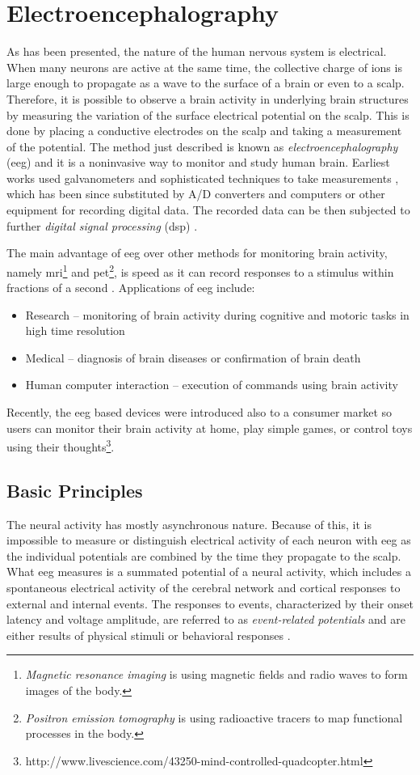 \section{Electroencephalography}
As has been presented, the nature of the human nervous system is electrical. When many neurons are active at the same time, the collective charge of ions is large enough to propagate as a wave to the surface of a brain or even to a scalp. Therefore, it is possible to observe a brain activity in underlying brain structures by measuring the variation of the surface electrical potential on the scalp. This is done by placing a conductive electrodes on the scalp and taking a measurement of the potential. The method just described is known as \emph{electroencephalography} (\gls{eeg}) and it is a noninvasive way to monitor and study human brain. Earliest works used galvanometers and sophisticated techniques to take measurements \cite{eegHistory}, which has been since substituted by A/D converters and computers or other equipment for recording digital data. The recorded data can be then subjected to further \emph{digital signal processing} (\gls{dsp}) \cite{eegClass}.

The main advantage of \gls{eeg} over other methods for monitoring brain activity, namely \gls{mri}\footnote{\emph{Magnetic resonance imaging} is using magnetic fields and radio waves to form images of the body.} and \gls{pet}\footnote{\emph{Positron emission tomography} is using radioactive tracers to map functional processes in the body.}, is speed as it can record responses
to a stimulus within fractions of a second \cite{eegFund}. Applications of \gls{eeg}
include:
\begin{itemize}
  \item Research -- monitoring of brain activity during cognitive and motoric tasks in high time resolution
  \item Medical -- diagnosis of brain diseases or confirmation of brain death 
  \item Human computer interaction -- execution of commands using brain activity  
\end{itemize}
Recently, the \gls{eeg} based devices were introduced also to a consumer market so users can monitor their brain activity at home, play simple games, or control toys using their thoughts\footnote{http://www.livescience.com/43250-mind-controlled-quadcopter.html}.

\subsection{Basic Principles}
The neural activity has mostly asynchronous nature. Because of this, it is impossible to measure or distinguish electrical activity of each neuron with \gls{eeg} as the individual potentials are combined by the time they propagate to the scalp.
What \gls{eeg} measures is a summated potential of a neural activity, which includes
a spontaneous electrical activity of the cerebral network and cortical responses to
external and internal events. The responses to events, characterized by their
onset latency and voltage amplitude, are referred to as \emph{event-related
potentials} and are either results of physical stimuli or behavioral responses \cite{bcComm}.

